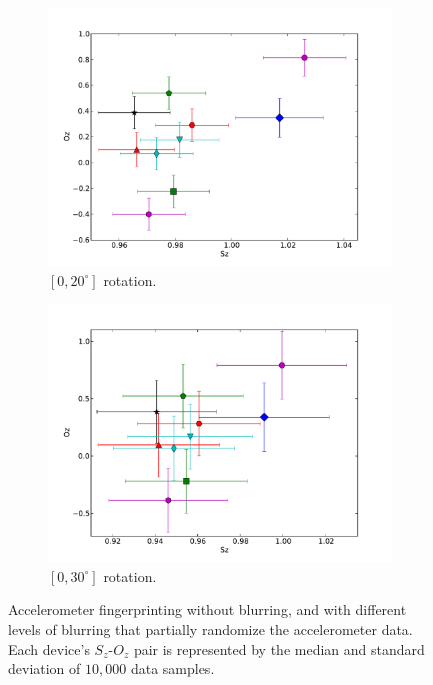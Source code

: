 \begin{figure}
\begin{subfigure}[b]{.25\textwidth}
  \includegraphics[width=\textwidth, trim={.9cm .5cm 1.8cm 1.3cm},clip]{figs/sz-oz-rand20.pdf}
  \caption{$[0, 20^{\circ}]$ rotation.}
  \label{fig:sub3}
\end{subfigure}%
\begin{subfigure}[b]{.25\textwidth}
  \centering
  \includegraphics[width=\textwidth, trim={.9cm .5cm 1.8cm 1.3cm},clip]{figs/sz-oz-rand30.pdf}
  \caption{$[0, 30^{\circ}]$ rotation.}
  \label{fig:sub3}
\end{subfigure}%

\caption{\small Accelerometer fingerprinting without blurring, and with different levels of 
blurring that partially randomize the accelerometer data. Each device's $S_z$-$O_z$
pair is represented by the median and standard deviation of $10,000$ data samples.
}

\label{fig:fingerprinting}
\end{figure}

